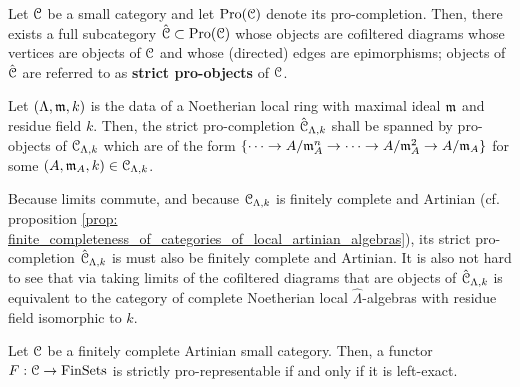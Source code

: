                 \begin{definition} \label{def: strict_pro_objects}
                    Let $\mathcal{C}$ be a small category and let $\mathrm{Pro}(\mathcal{C})$ denote its pro-completion. Then, there exists a full subcategory $\hat{\mathcal{C}} \subset \mathrm{Pro}(\mathcal{C})$ whose objects are cofiltered diagrams whose vertices are objects of $\mathcal{C}$ and whose (directed) edges are epimorphisms; objects of $\hat{\mathcal{C}}$ are referred to as \textbf{strict pro-objects} of $\mathcal{C}$. 
                \end{definition}
                \begin{example} \label{example: completed_artinian_local_algebras}
                    Let $(\Lambda, \mathfrak{m}, k)$ is the data of a Noetherian local ring with maximal ideal $\mathfrak{m}$ and residue field $k$. Then, the strict pro-completion $\hat{\mathcal{C}}_{\Lambda, k}$ shall be spanned by pro-objects of $\mathcal{C}_{\Lambda, k}$ which are of the form $\{\cdots \to A/\mathfrak{m}_A^n \to \cdots \to A/\mathfrak{m}_A^2 \to A/\mathfrak{m}_A\}$ for some $(A, \mathfrak{m}_A, k) \in \mathcal{C}_{\Lambda, k}$. 
                    
                    Because limits commute, and because $\mathcal{C}_{\Lambda, k}$ is finitely complete and Artinian (cf. proposition \ref{prop: finite_completeness_of_categories_of_local_artinian_algebras}), its strict pro-completion $\hat{\mathcal{C}}_{\Lambda, k}$ is must also be finitely complete and Artinian. It is also not hard to see that via taking limits of the cofiltered diagrams that are objects of $\hat{\mathcal{C}}_{\Lambda, k}$ is equivalent to the category of complete Noetherian local $\hat{\Lambda}$-algebras with residue field isomorphic to $k$.
                \end{example}
                \begin{theorem} \label{theorem: grothendieck_pro_representability_criterion}
                    \cite[Proposition 3.1]{grothendieck_fga_2} Let $\mathcal{C}$ be a finitely complete Artinian small category. Then, a functor $F: \mathcal{C} \to \mathrm{Fin}\mathrm{Sets}$ is strictly pro-representable if and only if it is left-exact.
                \end{theorem}
                

